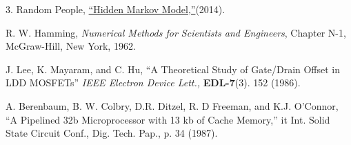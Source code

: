 \documentclass{wileySev}
\begin{document}
\begin{references}{3.}
Random People,
\href{http://en.wikipedia.org/wiki/Hidden_Markov_model}{``Hidden Markov Model,''}(2014).

R. W. Hamming,
                 {\it Numerical Methods for Scientists and 
                 Engineers}, Chapter N-1, McGraw-Hill, 
                 New York, 1962.

J. Lee, K. Mayaram, and C. Hu, ``A Theoretical
               Study of Gate/Drain Offset in LDD MOSFETs''
                     {\it IEEE Electron Device Lett.,} {\bf EDL-7}(3). 152 
                     (1986).

A. Berenbaum, 
B. W. Colbry, D.R. Ditzel, R. D Freeman, and 
K.J. O'Connor, ``A Pipelined 32b Microprocessor with 13 kb of Cache Memory,''
{it Int. Solid State Circuit Conf., Dig. Tech. Pap.,} p. 34 (1987).
\end{references}


\printindex
\end{document}
